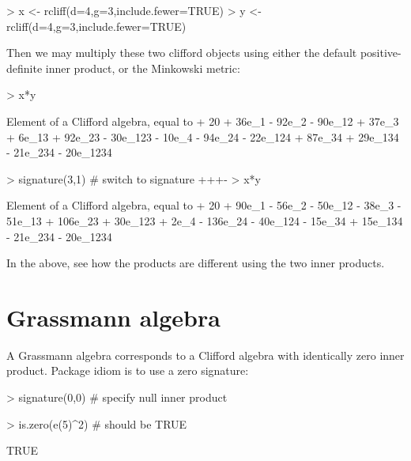 \documentclass{birkjour}
\theoremstyle{definition}
\theoremstyle{remark}
\numberwithin{equation}{section}
\begin{document}
\begin{Schunk}
\begin{Sinput}
> x <- rcliff(d=4,g=3,include.fewer=TRUE)
> y <- rcliff(d=4,g=3,include.fewer=TRUE)
\end{Sinput}
\end{Schunk}

Then we may multiply these two clifford objects using either the
default positive-definite inner product, or the Minkowski metric:

\begin{Schunk}
\begin{Sinput}
> x*y
\end{Sinput}
\begin{Soutput}
Element of a Clifford algebra, equal to
+ 20 + 36e_1 - 92e_2 - 90e_12 + 37e_3 + 6e_13 + 92e_23 - 30e_123 - 10e_4 -
94e_24 - 22e_124 + 87e_34 + 29e_134 - 21e_234 - 20e_1234
\end{Soutput}
\begin{Sinput}
> signature(3,1)  # switch to signature +++-
> x*y
\end{Sinput}
\begin{Soutput}
Element of a Clifford algebra, equal to
+ 20 + 90e_1 - 56e_2 - 50e_12 - 38e_3 - 51e_13 + 106e_23 + 30e_123 + 2e_4 -
136e_24 - 40e_124 - 15e_34 + 15e_134 - 21e_234 - 20e_1234
\end{Soutput}
\end{Schunk}

In the above, see how the products are different using the two inner
products.  

\section{Grassmann algebra}

A Grassmann algebra corresponds to a Clifford algebra with identically
zero inner product.  Package idiom is to use a zero signature:

\begin{Schunk}
\begin{Sinput}
> signature(0,0)  # specify null inner product
\end{Sinput}
\end{Schunk}
\begin{Schunk}
\begin{Sinput}
> is.zero(e(5)^2)     # should be TRUE
\end{Sinput}
\begin{Soutput}
[1] TRUE
\end{Soutput}
\end{Schunk}
\end{document}
